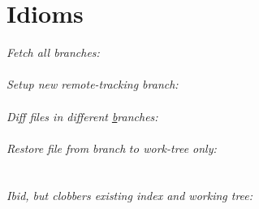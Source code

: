 \section{Idioms}

\textit{Fetch all branches:}\\
 \\[1mm]
\textit{Setup new remote-tracking branch:}\\
 \\[1mm]
\textit{Diff files in different \ul{b}ranches:} \\
 \\[1mm]
\textit{Restore file from branch $to$ work-tree only:} \\
 \\
 \\[1mm]
\textit{Ibid, but clobbers existing index and working tree:} \\
 \\[1mm]
